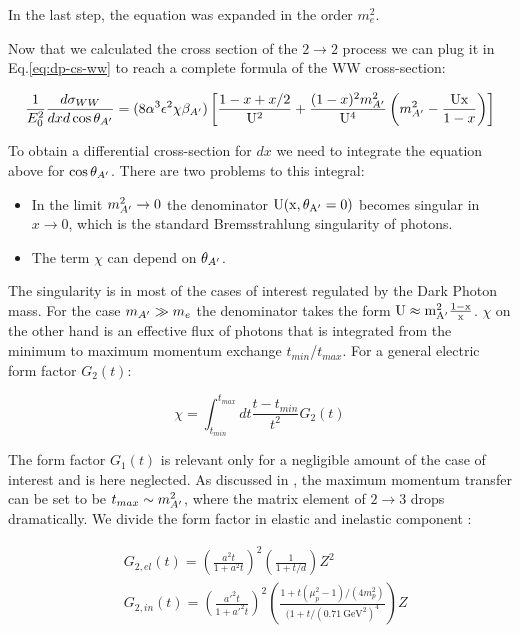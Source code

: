  In the last step, the equation was expanded in the order $m^2_e$.

 Now that we calculated the cross section of the $2 \to 2$ process we can plug it in Eq.\ref{eq:dp-cs-ww} to reach a complete formula of the WW cross-section:

 \begin{equation}
   \label{eq:dp-cs-ww-num}
   \frac{1}{E^2_0} \frac{d\sigma_{WW}}{dx d\cos{\theta_{A'}}} = (8 \alpha^3 \epsilon^2 \chi \beta_{A'}) \left[ \frac{1 - x + x/2}{\rm{U}^2} + \frac{(1-x)^2m^2_{A'}}{\rm{U}^4} \left(m^2_{A'} - \frac{\rm{U}x}{1 - x} \right) \right]
 \end{equation}

 To obtain a differential cross-section for $dx$ we need to integrate the equation above for $\cos{\theta_{A'}}$. There are two problems to this integral:

 \begin{itemize}
 \item In the limit $m^2_{A'} \to 0$ the denominator $\rm{U}(x, \theta_{A'} = 0)$ becomes singular in $x \to 0$, which is the standard Bremsstrahlung singularity of photons.   
 \item The term $\chi$ can depend on $\theta_{A'}$.
 \end{itemize}

 The singularity is in most of the cases of interest regulated by the Dark Photon mass. For the case $m_{A'} \gg m_e$ the denominator takes the form $\rm{U} \approx m^2_{A'} \frac{1-x}{x}$.
 $\chi$ on the other hand is an effective flux of photons that is integrated from the minimum to maximum momentum exchange $t_{min}$/$t_{max}$. For a general electric form factor $G_2(t)$:

 \begin{equation}
   \label{eq:g-ff}
   \chi = \int^{t_{max}}_{t_{min}} dt \frac{t - t_{min}}{t^2} G_2(t)
 \end{equation}

 The form factor $G_1(t)$ is relevant only for a negligible amount of the case of interest and is here neglected. As discussed in \cite{Kim:1973he,RevModPhys.46.815}, the maximum momentum transfer can be set to be $t_{max} \sim m^2_{A'}$, where the matrix element of $2 \to 3$ drops dramatically. We divide the form factor in elastic and inelastic component \cite{jdb}:

 \begin{align}
   \label{eq:g-ff-el}
   &G_{2,el}(t) = \left( \frac{a^2 t}{1 + a^2t} \right)^2 \left( \frac{1}{1 + t/d}\right) Z^2\\
   \label{eq:g-ff-in}
   &G_{2,in}(t) = \left( \frac{a'^2 t }{1 + a'^2 t} \right)^2 \left( \frac{1 + t (\mu_p^2 -1) / (4m^2_p)}{(1 + t / (\SI{0.71}{\giga\electronvolt\squared})^4} \right) Z
 \end{align}

